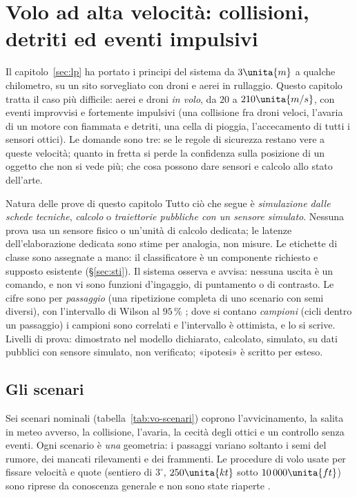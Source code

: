 \section{Volo ad alta velocità: collisioni, detriti ed eventi impulsivi}\label{sec:vo}
\sloppy

Il capitolo~\ref{sec:lp} ha portato i principi del sistema da $3\unita{m}$ a qualche chilometro, su un sito sorvegliato con droni e aerei in rullaggio. Questo capitolo tratta il caso più difficile: aerei e droni \emph{in volo}, da $20$ a $210\unita{m/s}$, con eventi improvvisi e fortemente impulsivi (una collisione fra droni veloci, l'avaria di un motore con fiammata e detriti, una cella di pioggia, l'accecamento di tutti i sensori ottici). Le domande sono tre: se le regole di sicurezza restano vere a queste velocità; quanto in fretta si perde la confidenza sulla posizione di un oggetto che non si vede più; che cosa possono dare sensori e calcolo allo stato dell'arte.

\begin{riquadro}{Natura delle prove di questo capitolo}
Tutto ciò che segue è \emph{simulazione dalle schede tecniche}, \emph{calcolo} o \emph{traiettorie pubbliche con un sensore simulato}. Nessuna prova usa un sensore fisico o un'unità di calcolo dedicata; le latenze dell'elaborazione dedicata sono stime per analogia, non misure. Le etichette di classe sono assegnate a mano: il classificatore è un componente richiesto e supposto esistente (\S\ref{sec:sti}). Il sistema osserva e avvisa: nessuna uscita è un comando, e non vi sono funzioni d'ingaggio, di puntamento o di contrasto. Le cifre sono per \emph{passaggio} (una ripetizione completa di uno scenario con semi diversi), con l'intervallo di Wilson al $95\,\%$ \cite{wilson1927}; dove si contano \emph{campioni} (cicli dentro un passaggio) i campioni sono correlati e l'intervallo è ottimista, e lo si scrive. Livelli di prova:  dimostrato nel modello dichiarato,  calcolato,  simulato,  su dati pubblici con sensore simulato,  non verificato; «ipotesi» è scritto per esteso.
\end{riquadro}

\subsection{Gli scenari}\label{sec:vo-scenari}

Sei scenari nominali (tabella~\ref{tab:vo-scenari}) coprono l'avvicinamento, la salita in meteo avverso, la collisione, l'avaria, la cecità degli ottici e un controllo senza eventi. Ogni scenario è \emph{una} geometria: i passaggi variano soltanto i semi del rumore, dei mancati rilevamenti e dei frammenti. Le procedure di volo usate per fissare velocità e quote (sentiero di $3^\circ$, $250\unita{kt}$ sotto $10\,000\unita{ft}$) sono riprese da conoscenza generale e non sono state riaperte .

